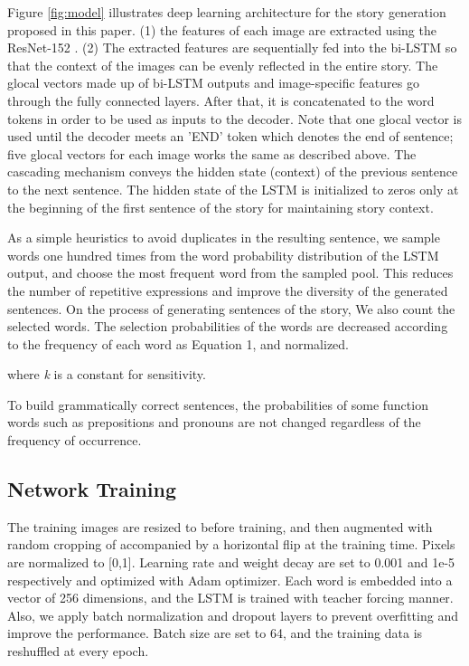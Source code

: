 \documentclass[11pt,a4paper]{article}
\begin{document}
Figure \ref{fig:model} illustrates deep learning architecture for the story generation proposed in this paper. 
(1) the features of each image are extracted using the ResNet-152 \cite{he2015resnet}. 
(2) The extracted features are sequentially fed into the bi-LSTM so that the context of the images can be evenly reflected in the entire story.
The glocal vectors made up of bi-LSTM outputs and image-specific features go through the fully connected layers. After that, it is concatenated to the word tokens in order to be used as inputs to the decoder.
Note that one glocal vector is used until the decoder meets an 'END' token which denotes the end of sentence;
five glocal vectors for each image works the same as described above.
The cascading mechanism conveys the hidden state (context) of the previous sentence to the next sentence. 
The hidden state of the LSTM is initialized to zeros only at the beginning of the first sentence of the story for maintaining story context.

As a simple heuristics to avoid duplicates in the resulting sentence, we sample words one hundred times from the word probability distribution of the LSTM output, and choose the most frequent word from the sampled pool.
This reduces the number of repetitive expressions and improve the diversity of the generated sentences.
On the process of generating sentences of the story, We also count the selected words.
The selection probabilities of the words are decreased according to the frequency of each word as Equation 1, and normalized.

where \textit{k} is a constant for sensitivity.

To build grammatically correct sentences, the probabilities of some function words such as prepositions and pronouns are not changed regardless of the frequency of occurrence.

\subsection{Network Training}
The training images are resized to  before training, and then augmented with random cropping of  accompanied by a horizontal flip at the training time. 
Pixels are normalized to [0,1]. 
Learning rate and weight decay are set to 0.001 and 1e-5 respectively and optimized with Adam optimizer. 
Each word is embedded into a vector of 256 dimensions, and the LSTM is trained with teacher forcing manner. 
Also, we apply batch normalization and dropout layers to prevent overfitting and improve the performance. 
Batch size are set to 64, and the training data is reshuffled at every epoch.
\end{document}
